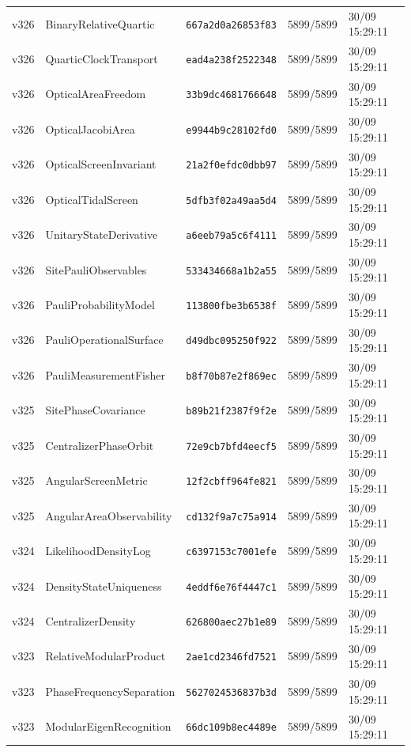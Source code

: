 \documentclass[11pt]{article}
\theoremstyle{definition}\newtheorem{deriv}{Derivação}
\begin{document}
{\begin{longtable}{@{}lllll@{}}
v326 & BinaryRelativeQuartic & \texttt{667a2d0a26853f83} & 5899/5899 & 30/09 15:29:11 \\
v326 & QuarticClockTransport & \texttt{ead4a238f2522348} & 5899/5899 & 30/09 15:29:11 \\
v326 & OpticalAreaFreedom & \texttt{33b9dc4681766648} & 5899/5899 & 30/09 15:29:11 \\
v326 & OpticalJacobiArea & \texttt{e9944b9c28102fd0} & 5899/5899 & 30/09 15:29:11 \\
v326 & OpticalScreenInvariant & \texttt{21a2f0efdc0dbb97} & 5899/5899 & 30/09 15:29:11 \\
v326 & OpticalTidalScreen & \texttt{5dfb3f02a49aa5d4} & 5899/5899 & 30/09 15:29:11 \\
v326 & UnitaryStateDerivative & \texttt{a6eeb79a5c6f4111} & 5899/5899 & 30/09 15:29:11 \\
v326 & SitePauliObservables & \texttt{533434668a1b2a55} & 5899/5899 & 30/09 15:29:11 \\
v326 & PauliProbabilityModel & \texttt{113800fbe3b6538f} & 5899/5899 & 30/09 15:29:11 \\
v326 & PauliOperationalSurface & \texttt{d49dbc095250f922} & 5899/5899 & 30/09 15:29:11 \\
v326 & PauliMeasurementFisher & \texttt{b8f70b87e2f869ec} & 5899/5899 & 30/09 15:29:11 \\
v325 & SitePhaseCovariance & \texttt{b89b21f2387f9f2e} & 5899/5899 & 30/09 15:29:11 \\
v325 & CentralizerPhaseOrbit & \texttt{72e9cb7bfd4eecf5} & 5899/5899 & 30/09 15:29:11 \\
v325 & AngularScreenMetric & \texttt{12f2cbff964fe821} & 5899/5899 & 30/09 15:29:11 \\
v325 & AngularAreaObservability & \texttt{cd132f9a7c75a914} & 5899/5899 & 30/09 15:29:11 \\
v324 & LikelihoodDensityLog & \texttt{c6397153c7001efe} & 5899/5899 & 30/09 15:29:11 \\
v324 & DensityStateUniqueness & \texttt{4eddf6e76f4447c1} & 5899/5899 & 30/09 15:29:11 \\
v324 & CentralizerDensity & \texttt{626800aec27b1e89} & 5899/5899 & 30/09 15:29:11 \\
v323 & RelativeModularProduct & \texttt{2ae1cd2346fd7521} & 5899/5899 & 30/09 15:29:11 \\
v323 & PhaseFrequencySeparation & \texttt{5627024536837b3d} & 5899/5899 & 30/09 15:29:11 \\
v323 & ModularEigenRecognition & \texttt{66dc109b8ec4489e} & 5899/5899 & 30/09 15:29:11 \\

\end{longtable}}
\end{document}
